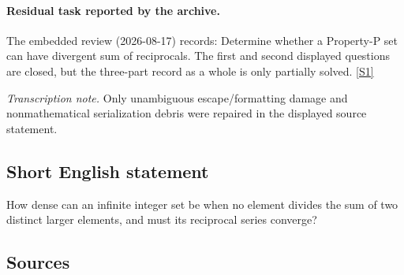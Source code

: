 \documentclass[11pt,a4paper]{article}
\newcommand{\sref}[2]{\hyperlink{source:#1:#2}{[S#2]}}
\begin{document}
\paragraph{Residual task reported by the archive.}

The embedded review (2026-08-17) records: Determine whether a Property-P set can have divergent sum of reciprocals. The first and second displayed questions are closed, but the three-part record as a whole is only partially solved. \sref{statement}{1}

{\small\emph{Transcription note.} Only unambiguous escape/formatting damage and nonmathematical serialization debris were repaired in the displayed source statement.}

\subsection{Short English statement}

How dense can an infinite integer set be when no element divides the sum of two distinct larger elements, and must its reciprocal series converge?

\subsection{Sources}
\end{document}
